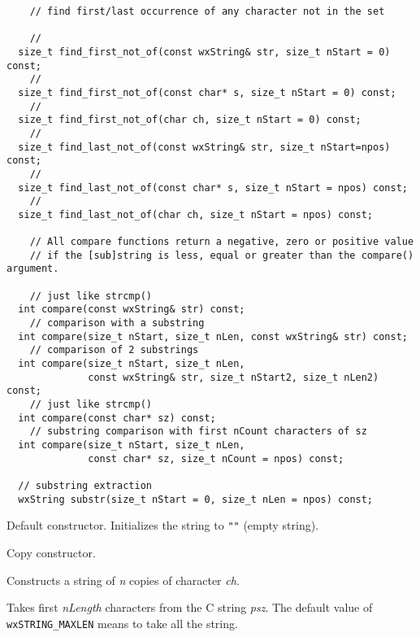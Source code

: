 \begin{verbatim}
    // find first/last occurrence of any character not in the set

    //
  size_t find_first_not_of(const wxString& str, size_t nStart = 0) const;
    //
  size_t find_first_not_of(const char* s, size_t nStart = 0) const;
    //
  size_t find_first_not_of(char ch, size_t nStart = 0) const;
    //
  size_t find_last_not_of(const wxString& str, size_t nStart=npos) const;
    //
  size_t find_last_not_of(const char* s, size_t nStart = npos) const;
    //
  size_t find_last_not_of(char ch, size_t nStart = npos) const;

    // All compare functions return a negative, zero or positive value
    // if the [sub]string is less, equal or greater than the compare() argument.

    // just like strcmp()
  int compare(const wxString& str) const;
    // comparison with a substring
  int compare(size_t nStart, size_t nLen, const wxString& str) const;
    // comparison of 2 substrings
  int compare(size_t nStart, size_t nLen,
              const wxString& str, size_t nStart2, size_t nLen2) const;
    // just like strcmp()
  int compare(const char* sz) const;
    // substring comparison with first nCount characters of sz
  int compare(size_t nStart, size_t nLen,
              const char* sz, size_t nCount = npos) const;

  // substring extraction
  wxString substr(size_t nStart = 0, size_t nLen = npos) const;
\end{verbatim}


\label{wxstringconstruct}


Default constructor. Initializes the string to {\tt ""} (empty string).


Copy constructor.


Constructs a string of {\it n} copies of character {\it ch}.


Takes first {\it nLength} characters from the C string {\it psz}.
The default value of {\tt wxSTRING\_MAXLEN} means to take all the string.


